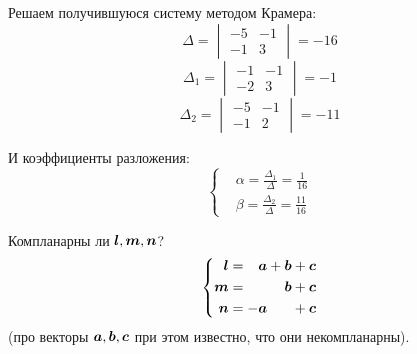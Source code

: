 \documentclass[a4paper,12pt]{article}
\begin{document}
\begin{solution}
    Решаем получившуюся систему методом Крамера:
    \[
      \Delta = \begin{vmatrix}
        -5 & -1\\
        -1 & 3
      \end{vmatrix} = -16
    \]
    \[
      \Delta_1 = \begin{vmatrix}
        -1 & -1\\
        -2 & 3
      \end{vmatrix} = -1
    \]
    \[
      \Delta_2 = \begin{vmatrix}
        -5 & -1\\
        -1 & 2
      \end{vmatrix} = -11
    \]
    
    И коэффициенты разложения:
    \[
      \left\{
        \begin{aligned}
          &\alpha = \frac{\Delta_1}{\Delta} = \frac{1}{16}\\
          &\beta = \frac{\Delta_2}{\Delta} = \frac{11}{16}
        \end{aligned}
      \right.
    \]
  \end{solution}
  

  \begin{problem}[1.11(1)]
    Компланарны ли $\boldsymbol l, \boldsymbol m, \boldsymbol n$?
    \begin{equation}
      \label{eq:problem1.11}
      \left\{
        \begin{aligned}
          \bds l &= \hphantom{-}\bds a + \bds b + \bds c\\
          \bds m &= \hphantom{-\bds a + {}} \bds b + \bds c\\
          \bds n &= -\bds a \hphantom{{} + \bds b} + \bds c
        \end{aligned}
      \right.
    \end{equation}
    (про векторы $\boldsymbol a, \boldsymbol b, \boldsymbol c$ при этом известно, что они некомпланарны).
  \end{problem}
  
\end{document}
